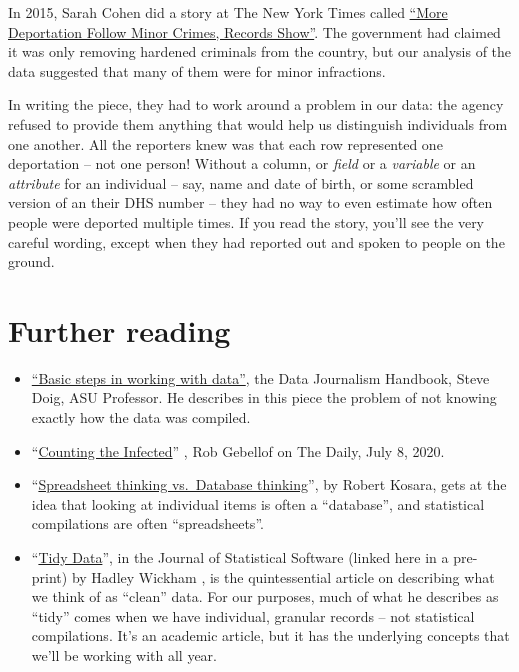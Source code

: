 \documentclass[
  letterpaper,
  DIV=11,
  numbers=noendperiod]{scrreprt}
\begin{document}
In 2015, Sarah Cohen did a story at The New York Times called
\href{https://www.nytimes.com/2014/04/07/us/more-deportations-follow-minor-crimes-data-shows.html}{``More
Deportation Follow Minor Crimes, Records Show''}. The government had
claimed it was only removing hardened criminals from the country, but
our analysis of the data suggested that many of them were for minor
infractions.

In writing the piece, they had to work around a problem in our data: the
agency refused to provide them anything that would help us distinguish
individuals from one another. All the reporters knew was that each row
represented one deportation -- not one person! Without a column, or
\emph{field} or a \emph{variable} or an \emph{attribute} for an
individual -- say, name and date of birth, or some scrambled version of
an their DHS number -- they had no way to even estimate how often people
were deported multiple times. If you read the story, you'll see the very
careful wording, except when they had reported out and spoken to people
on the ground.

\hypertarget{further-reading}{%
\section{Further reading}\label{further-reading}}

\begin{itemize}
\item
  \href{https://datajournalism.com/read/handbook/one/understanding-data/basic-steps-in-working-with-data}{``Basic
  steps in working with data''}, the Data Journalism Handbook, Steve
  Doig, ASU Professor. He describes in this piece the problem of not
  knowing exactly how the data was compiled.
\item
  ``\href{https://www.nytimes.com/2020/07/08/podcasts/the-daily/coronavirus-data-united-states.html}{Counting
  the Infected}'' , Rob Gebellof on The Daily, July 8, 2020.
\item
  ``\href{https://eagereyes.org/basics/spreadsheet-thinking-vs-database-thinking}{Spreadsheet
  thinking vs.~Database thinking}'', by Robert Kosara, gets at the idea
  that looking at individual items is often a ``database'', and
  statistical compilations are often ``spreadsheets''.
\item
  ``\href{https://vita.had.co.nz/papers/tidy-data.pdf}{Tidy Data}'', in
  the Journal of Statistical Software (linked here in a pre-print) by
  Hadley Wickham , is the quintessential article on describing what we
  think of as ``clean'' data. For our purposes, much of what he
  describes as ``tidy'' comes when we have individual, granular records
  -- not statistical compilations. It's an academic article, but it has
  the underlying concepts that we'll be working with all year.
\end{itemize}
\end{document}
